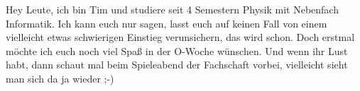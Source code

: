 \begin{multicols*}{2}
\small

{Hey Leute, ich bin Tim und studiere seit 4 Semestern Physik mit Nebenfach Informatik. Ich kann euch nur sagen, lasst euch auf keinen Fall von einem vielleicht etwas schwierigen Einstieg verunsichern, das wird schon. Doch erstmal möchte ich euch noch viel Spaß in der O-Woche wünschen. Und wenn ihr Lust habt, dann schaut mal beim Spieleabend der Fachschaft vorbei, vielleicht sieht man sich da ja wieder ;-)}



\end{multicols*}

